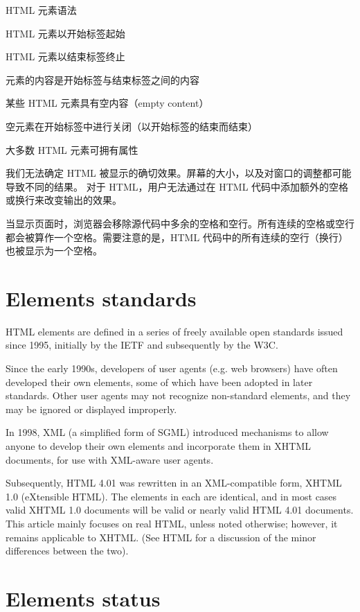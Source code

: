 HTML 元素语法

\begin{compactitem}
\item HTML 元素以开始标签起始
\item HTML 元素以结束标签终止
\item 元素的内容是开始标签与结束标签之间的内容
\item 某些 HTML 元素具有空内容（empty content）
\item 空元素在开始标签中进行关闭（以开始标签的结束而结束）
\item 大多数 HTML 元素可拥有属性
\end{compactitem}

我们无法确定 HTML 被显示的确切效果。屏幕的大小，以及对窗口的调整都可能导致不同的结果。
对于 HTML，用户无法通过在 HTML 代码中添加额外的空格或换行来改变输出的效果。

当显示页面时，浏览器会移除源代码中多余的空格和空行。所有连续的空格或空行都会被算作一个空格。需要注意的是，HTML 代码中的所有连续的空行（换行）也被显示为一个空格。

\section{Elements standards}


HTML elements are defined in a series of freely available open standards issued since 1995, initially by the IETF and subsequently by the W3C.

Since the early 1990s, developers of user agents (e.g. web browsers) have often developed their own elements, some of which have been adopted in later standards. Other user agents may not recognize non-standard elements, and they may be ignored or displayed improperly.

In 1998, XML (a simplified form of SGML) introduced mechanisms to allow anyone to develop their own elements and incorporate them in XHTML documents, for use with XML-aware user agents.

Subsequently, HTML 4.01 was rewritten in an XML-compatible form, XHTML 1.0 (eXtensible HTML). The elements in each are identical, and in most cases valid XHTML 1.0 documents will be valid or nearly valid HTML 4.01 documents. This article mainly focuses on real HTML, unless noted otherwise; however, it remains applicable to XHTML. (See HTML for a discussion of the minor differences between the two).


\section{Elements status}


